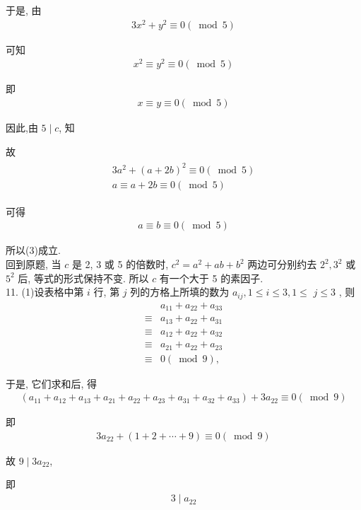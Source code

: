 于是, 由
\begin{align*}
	3 x^{2}+y^{2} \equiv 0(\bmod 5)
\end{align*}

可知
\begin{align*}
	x^{2} \equiv y^{2} \equiv 0(\bmod 5)
\end{align*}

即
\begin{align*}
	x \equiv y \equiv 0(\bmod 5)
\end{align*}

因此,由 $5 \mid c$, 知

故
\begin{align*}
	\begin{gathered}
		3 a^{2}+(a+2 b)^{2} \equiv 0(\bmod 5) \\
		a \equiv a+2 b \equiv 0(\bmod 5)
	\end{gathered}
\end{align*}

可得
\begin{align*}
	a \equiv b \equiv 0(\bmod 5)
\end{align*}

所以(3)成立. \\
回到原题, 当 $c$ 是 2, 3 或 5 的倍数时,  $c^{2}=a^{2}+a b+b^{2}$ 两边可分别约去 $2^{2} ,  3^{2}$ 或 $5^{2}$ 后, 等式的形式保持不变. 所以 $c$ 有一个大于 5 的素因子. \\
11. (1)设表格中第 $i$ 行, 第 $j$ 列的方格上所填的数为 $a_{i j}, 1 \leqslant i \leqslant 3,1 \leqslant$ $j \leqslant 3$ , 则\begin{align}
	       & a_{11}+a_{22}+a_{33} \\
	\equiv & a_{13}+a_{22}+a_{31} \\
	\equiv & a_{12}+a_{22}+a_{32} \\
	\equiv & a_{21}+a_{22}+a_{23} \\
	\equiv & 0(\bmod 9),
\end{align}

于是, 它们求和后, 得
\begin{align*}
	\left(a_{11}+a_{12}+a_{13}+a_{21}+a_{22}+a_{23}+a_{31}+a_{32}+a_{33}\right)+3 a_{22} \equiv 0(\bmod 9)
\end{align*}

即
\begin{align*}
	3 a_{22}+(1+2+\cdots+9) \equiv 0(\bmod 9)
\end{align*}

故 $9 \mid 3 a_{22}$,

即
\begin{align*}
	3 \mid a_{22}
\end{align*}

